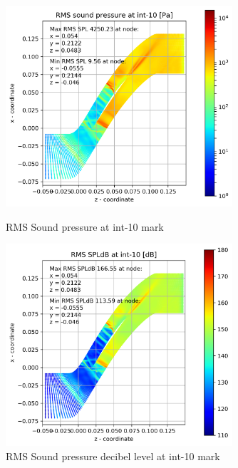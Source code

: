 \begin{figure}[ht]
  \centering
  \includegraphics[width=0.75\textwidth]{Figures/int-10-rms-spl.png}
  \caption{RMS Sound pressure at int-10 mark} \label{int-10-rms-spl}
  
  \vspace*{\floatsep}%

  \includegraphics[width=0.75\textwidth]{Figures/int-10-rms-spldb.png}
  \caption{RMS Sound pressure decibel level at int-10 mark} \label{int-10-rms-spldb}
\end{figure}
